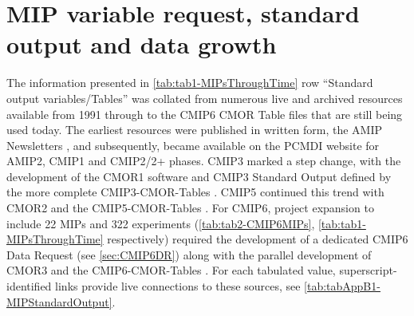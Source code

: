 \documentclass[manuscript]{copernicus}
\begin{document}
\section{MIP variable request, standard output and data growth}  %
\label{sec:secAppB1-MIPStandardOutput}
The information presented in \autoref{tab:tab1-MIPsThroughTime} row ``Standard output variables/Tables'' was collated from numerous live and archived resources available from 1991 through to the CMIP6 CMOR Table files that are still being used today. The earliest resources were published in written form, the AMIP Newsletters \citep[e.g.,][]{gates_amip_1991}, and subsequently, became available on the PCMDI website for AMIP2, CMIP1 and CMIP2/2+ phases. CMIP3 marked a step change, with the development of the CMOR1 software \citep{taylor_cmor_2006} and CMIP3 Standard Output defined by the more complete CMIP3-CMOR-Tables \citep{doutriaux_cmip3_2005}. CMIP5 continued this trend with CMOR2 \citep{doutriaux_cmor_2011} and the CMIP5-CMOR-Tables \citep{doutriaux_cmip5_2013}. For CMIP6, project expansion to include 22 MIPs and 322 experiments (\autoref{tab:tab2-CMIP6MIPs}, \autoref{tab:tab1-MIPsThroughTime} respectively) required the development of a dedicated CMIP6 Data Request (see \autoref{sec:CMIP6DR}) along with the parallel development of CMOR3 \citep{mauzey_cmor_2024} and the CMIP6-CMOR-Tables \citep{nadeau_cmip6_2017}. For each tabulated value, superscript-identified links provide live connections to these sources, see \autoref{tab:tabAppB1-MIPStandardOutput}.
\end{document}
